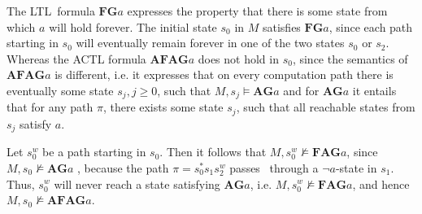 The LTL\ formula $\mathbf{FG}a$ expresses the property that there is some
state from which $a$ will hold forever. The initial state $s_{0}$ in $M$
satisfies $\mathbf{FG}a$, since each path starting in $s_{0}$ will
eventually remain forever in one of the two states $s_{0}$ or $s_{2}$.
Whereas the ACTL formula $\mathbf{AFAG}a$ does not hold in $s_{0}$, since
the semantics of $\mathbf{AFAG}a$ is different, i.e. it expresses that on
every computation path there is eventually some state $s_{j},j\geq 0$, such
that $M,s_{j}\vDash \mathbf{AG}a$ and for $\mathbf{AG}a$ it entails that for
any path $\pi $, there exists some state $s_{j}$, such that all reachable
states from $s_{j}$ satisfy $a$.

Let $s_{0}^{w}$ be a path starting in $s_{0}$. Then it follows that $%
M,s_{0}^{w}\nvDash \mathbf{FAG}a$, since $M,s_{0}\nvDash \mathbf{AG}a$%
, because the path $\pi =s_{0}^{\ast }s_{1}s_{2}^{w}$ passes \ through a $%
\lnot a$-state in $s_{1}$. Thus, $s_{0}^{w}$ will never reach a state
satisfying $\mathbf{AG}a$, i.e. $M,s_{0}^{w}\nvDash \mathbf{FAG}a$, and
hence $M,s_{0}\nvDash \mathbf{AFAG}a$.

